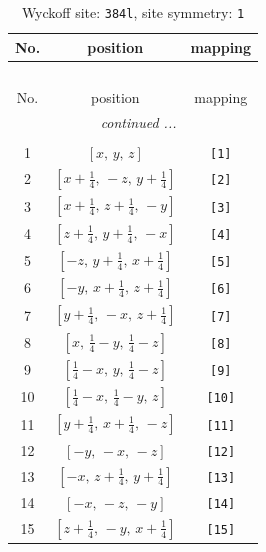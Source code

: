 \documentclass[fleqn,8pt]{jsarticle}
\begin{document}
\begin{longtable}{ccc}
\caption{Wyckoff site: {\tt 384l}, site symmetry: {\tt 1}}
 \\
 \hline \hline
No. & position & mapping \\ \hline \endfirsthead

\multicolumn{2}{l}{\tablename\ \thetable{}} \\
 \hline \hline
No. & position & mapping \\ \hline \endhead

 \hline \hline
\multicolumn{2}{r}{\footnotesize\it continued ...} \\ \endfoot

 \hline \hline
\multicolumn{2}{r}{} \\ \endlastfoot

1 & $\left[ x,\, y,\, z \right]$ & {\tt [1]} \\ \hline
2 & $\left[ x + \frac{1}{4},\, - z,\, y + \frac{1}{4} \right]$ & {\tt [2]} \\ \hline
3 & $\left[ x + \frac{1}{4},\, z + \frac{1}{4},\, - y \right]$ & {\tt [3]} \\ \hline
4 & $\left[ z + \frac{1}{4},\, y + \frac{1}{4},\, - x \right]$ & {\tt [4]} \\ \hline
5 & $\left[ - z,\, y + \frac{1}{4},\, x + \frac{1}{4} \right]$ & {\tt [5]} \\ \hline
6 & $\left[ - y,\, x + \frac{1}{4},\, z + \frac{1}{4} \right]$ & {\tt [6]} \\ \hline
7 & $\left[ y + \frac{1}{4},\, - x,\, z + \frac{1}{4} \right]$ & {\tt [7]} \\ \hline
8 & $\left[ x,\, \frac{1}{4} - y,\, \frac{1}{4} - z \right]$ & {\tt [8]} \\ \hline
9 & $\left[ \frac{1}{4} - x,\, y,\, \frac{1}{4} - z \right]$ & {\tt [9]} \\ \hline
10 & $\left[ \frac{1}{4} - x,\, \frac{1}{4} - y,\, z \right]$ & {\tt [10]} \\ \hline
11 & $\left[ y + \frac{1}{4},\, x + \frac{1}{4},\, - z \right]$ & {\tt [11]} \\ \hline
12 & $\left[ - y,\, - x,\, - z \right]$ & {\tt [12]} \\ \hline
13 & $\left[ - x,\, z + \frac{1}{4},\, y + \frac{1}{4} \right]$ & {\tt [13]} \\ \hline
14 & $\left[ - x,\, - z,\, - y \right]$ & {\tt [14]} \\ \hline
15 & $\left[ z + \frac{1}{4},\, - y,\, x + \frac{1}{4} \right]$ & {\tt [15]} \\ \hline

\end{longtable}
\end{document}
